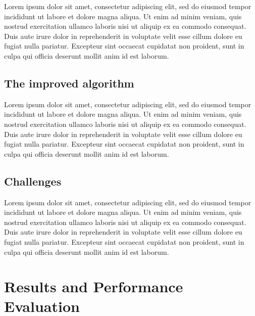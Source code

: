\documentclass[10pt,twocolumn,letterpaper]{article}
\begin{document}
Lorem ipsum dolor sit amet, consectetur adipiscing elit, sed do eiusmod tempor
incididunt ut labore et dolore magna aliqua. Ut enim ad minim veniam, quis
nostrud exercitation ullamco laboris nisi ut aliquip ex ea commodo consequat.
Duis aute irure dolor in reprehenderit in voluptate velit esse cillum dolore eu
fugiat nulla pariatur. Excepteur sint occaecat cupidatat non proident, sunt in
culpa qui officia deserunt mollit anim id est laborum.


\subsection{The improved algorithm}\label{subsec:the-improved-algorithm}

Lorem ipsum dolor sit amet, consectetur adipiscing elit, sed do eiusmod tempor
incididunt ut labore et dolore magna aliqua. Ut enim ad minim veniam, quis
nostrud exercitation ullamco laboris nisi ut aliquip ex ea commodo consequat.
Duis aute irure dolor in reprehenderit in voluptate velit esse cillum dolore eu
fugiat nulla pariatur. Excepteur sint occaecat cupidatat non proident, sunt in
culpa qui officia deserunt mollit anim id est laborum.


\subsection{Challenges}\label{subsec:challenges}

Lorem ipsum dolor sit amet, consectetur adipiscing elit, sed do eiusmod tempor
incididunt ut labore et dolore magna aliqua. Ut enim ad minim veniam, quis
nostrud exercitation ullamco laboris nisi ut aliquip ex ea commodo consequat.
Duis aute irure dolor in reprehenderit in voluptate velit esse cillum dolore eu
fugiat nulla pariatur. Excepteur sint occaecat cupidatat non proident, sunt in
culpa qui officia deserunt mollit anim id est laborum.


\section{Results and Performance Evaluation}\label{sec:results-and-performance-evaluation}
\end{document}
